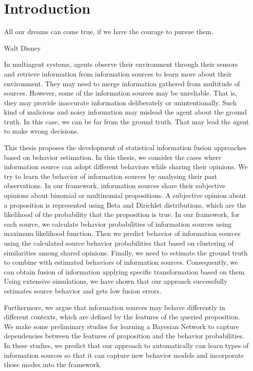 \documentclass[a4,12pt]{ozu-thesis}
\begin{document}
\begin{preliminary}
\begin{abbrv}
\end{abbrv}

\end{preliminary}

\chapter{Introduction}
\epigraph{All our dreams can come true, if we have the courage to pursue them.}{Walt Disney}

In multiagent systems, agents observe their environment through their sensors and retrieve information from information sources to learn more about their environment. They may need to merge information gathered from multitude of sources. However, some of the information sources may be unreliable. That is, they may provide inaccurate information deliberately or unintentionally. Such kind of malicious and noisy information may mislead the agent about the ground truth. In this case, we can be far from the ground truth. That may lead the agent to make wrong decisions.

This thesis proposes the development of statistical information fusion approaches based on behavior estimation.  In this thesis, we consider the cases where information source can adopt different behaviors while sharing their opinions.  We try to learn the behavior of information sources by analysing their past observations. In our framework, information sources share their subjective opinions about binomial or multinomial propositions. A subjective opinion about a proposition is represented using Beta and Dirichlet distributions, which are the likelihood of the probability that the proposition is true. In our framework, for each source, we calculate behavior probabilities of information sources using maximum likelihood function. Then we predict behavior of information sources using the calculated source behavior probabilities that based on clustering of similarities among shared opinions. Finally, we need to estimate the ground truth to combine with estimated behaviors of information sources. Consequently, we can obtain fusion of information applying specific transformation based on them. Using extensive simulations, we have shown that our approach successfully estimates source behavior and gets low fusion errors.

Furthermore, we argue that information sources may behave differently in different contexts, which are defined by the features of the queried proposition. We make some preliminary studies for learning a Bayesian Network to capture dependencies between the features of proposition and the behavior probabilities. In these studies, we predict that our approach to automatically can learn types of information sources so that it can capture new behavior models and incorporate those modes into the framework.
\end{document}
